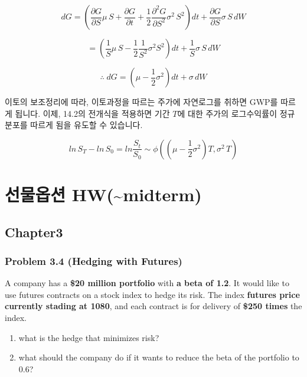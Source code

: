 \documentclass[
  letterpaper,
  DIV=11,
  numbers=noendperiod]{scrreprt}
\begin{document}
\[dG=(\frac{\partial G}{\partial S}\mu\,S+\frac{\partial G}{\partial t}+\frac{1}{2}\frac{\partial^2 G}{\partial S^2}\sigma^2\,S^2)dt+\frac{\partial G}{\partial S}\sigma\,S\,dW\]

\[=(\frac{1}{S}\mu\,S-\frac{1}{2}\frac{1}{S^2}\sigma^2S^2)dt+\frac{1}{S}\sigma\,S\,dW\]

\[\therefore\;dG=(\mu-\frac{1}{2}\sigma^2)dt+\sigma\,dW\]

이토의 보조정리에 따라, 이토과정을 따르는 주가에 자연로그를 취하면 GWP를
따르게 됩니다. 이제, 14.2의 전개식을 적용하면 기간 \(T\)에 대한 주가의
로그수익률이 정규분포를 따르게 됨을 유도할 수 있습니다.

\[ln\,S_T-ln\,S_0=ln\frac{S_t}{S_0}\sim\phi((\mu-\frac{1}{2}\sigma^2)T,\sigma^2\,T)\]


\chapter*{선물옵션
HW(\textasciitilde midterm)}\label{uxc120uxbb3cuxc635uxc158-hwmidterm}


\section*{Chapter3}\label{chapter3}


\subsection*{\texorpdfstring{\textbf{Problem 3.4} (Hedging with
Futures)}{Problem 3.4 (Hedging with Futures)}}\label{problem-3.4-hedging-with-futures}

A company has a \textbf{\$20 million portfolio} with \textbf{a beta of
1.2}. It would like to use futures contracts on a stock index to hedge
its risk. The index \textbf{futures price currently stading at 1080},
and each contract is for delivery of \textbf{\$250 times} the index.

\begin{enumerate}
\def\labelenumi{(\arabic{enumi})}
\item
  what is the hedge that minimizes risk?
\item
  what should the company do if it wants to reduce the beta of the
  portfolio to 0.6?
\end{enumerate}
\end{document}
